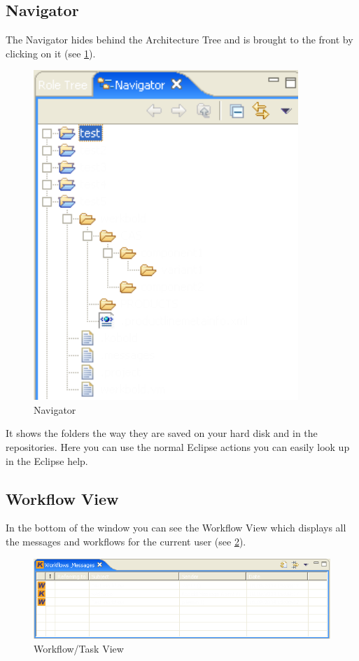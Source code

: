 \subsection{Navigator}
The Navigator hides behind the Architecture Tree and is brought to the front by
clicking on it (see \ref{navigator}).

\begin{figure}[h!]
\begin{center}
\includegraphics[width=10cm]{roletree2.png}
   \caption{Navigator}
\label{navigator}
\end{center}
\end{figure}\par

It shows the folders the way they are saved on your hard disk and in the repositories.
Here you can use the normal Eclipse actions you can easily look up in the Eclipse help.






\subsection{Workflow View}

In the bottom of the window you can see the Workflow View which displays all 
the messages and workflows for the current user (see \ref{workflow}). 

\begin{figure}[h!]
\begin{center}
\includegraphics[width=15cm]{workflow.png}
   \caption{Workflow/Task View}
\label{workflow}
\end{center}
\end{figure}\par

